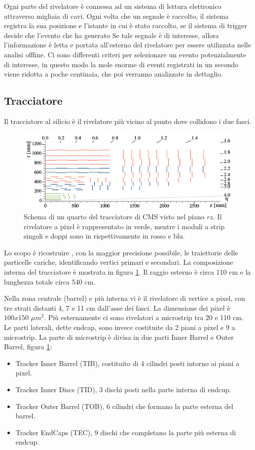 Ogni parte del rivelatore è connessa ad un sistema di lettura elettronico attraverso migliaia di cavi. Ogni volta che un segnale è raccolto, il sistema registra la sua posizione e l'istante in cui è stato raccolto, se il sistema di trigger decide che l'evento che ha generato Se tale segnale è di interesse, allora l'informazione è letta e portata all'esterno del rivelatore per essere utilizzata nelle analisi offline.
Ci sono differenti criteri per selezionare un evento potenzialmente di interesse, in questo modo la mole enorme di eventi registrati in un secondo viene ridotta a poche centinaia, che poi verranno analizzate in dettaglio.


\subsection{Tracciatore}
Il tracciatore al silicio  è il rivelatore più vicino al punto dove collidono i due fasci. 
\begin{figure}
\centering
\includegraphics[scale=0.4]{Immagini/CMStracker2}
\caption{Schema di un quarto del tracciatore di CMS visto nel piano $rz$. Il rivelatore a pixel è rappresentato in verde, mentre i moduli a strip singoli e doppi sono in rispettivamente in rosso e blu.}
\label{CMStracker}
\end{figure}
Lo scopo è ricostruire , con la maggior precisione possibile, le traiettorie delle particelle cariche, identificando vertici primari e secondari. La composizione interna del tracciatore è mostrata in figura \ref{CMStracker}. Il raggio esterno è circa 110 cm e la lunghezza totale circa 540 cm.

Nella zona centrale (barrel) e più interna vi è il rivelatore di vertice a pixel, con tre strati distanti 4, 7 e 11 cm dall'asse dei fasci. La dimensione dei pixel è $100x150$ $\mu m^2$. Più esternamente ci sono rivelatori a microstrip tra 20 e 110 cm. Le parti laterali, dette endcap, sono invece costituite da 2 piani a pixel e 9 a microstrip. La parte di microstrip è divisa in due parti Inner Barrel e Outer Barrel, figura \ref{CMStracker}:
\begin{itemize}
\item Tracker Inner Barrel (TIB), costituito di 4 cilindri posti intorno ai piani a pixel.
\item Tracker Inner Discs (TID), 3 dischi posti nella parte interna di endcup.
\item Tracker Outer Barrel (TOB), 6 cilindri che formano la parte esterna del barrel.
\item Tracker EndCaps (TEC), 9 dischi che completano la parte più esterna di endcup.
\end{itemize}

